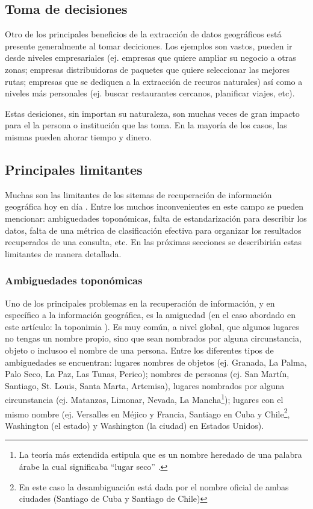 \subsection{Toma de decisiones}\label{sec:deci}

Otro de los principales beneficios de la extracción de datos geográficos está
presente generalmente al tomar deciciones. Los ejemplos son vastos, pueden ir
desde niveles empresariales (ej. empresas que quiere ampliar su negocio a otras
zonas; empresas distribuidoras de paquetes que quiere seleccionar las mejores
rutas; empresas que se dediquen a la extracción de recuros naturales) así como
a niveles más personales (ej. buscar restaurantes cercanos, planificar viajes, etc).

Estas desiciones, sin importan su naturaleza, son muchas veces de gran impacto
para el la persona o institución que las toma. En la mayoría de los casos,
las mismas pueden ahorar tiempo y dinero.

\subsection{Principales limitantes}\label{sec:limit}

Muchas son las limitantes de los sitemas de recuperación de información
geográfica hoy en día \cite{purves2011,purves2004}. Entre los muchos
inconvenientes en este campo se pueden mencionar: ambiguedades toponómicas,
falta de estandarización para describir los datos, falta de una métrica de
clasificación efectiva para organizar los resultados recuperados de una
consulta, etc. En las próximas secciones se describirián estas limitantes de
manera detallada.

\subsubsection{Ambiguedades toponómicas}\label{sec:ambig}

Uno de los principales problemas en la recuperación de información, y en
específico a la información geográfica, es la amiguedad (en el caso abordado en
este artículo: la toponimia \cite{buscaldi2009}). Es muy común, a nivel global,
que algunos lugares no tengas un nombre propio, sino que sean nombrados por
alguna circunstancia, objeto o inclusoo el nombre de una persona. Entre los
diferentes tipos de ambiguedades se encuentran: lugares nombres de objetos (ej.
Granada, La Palma, Palo Seco, La Paz, Las Tunas, Perico); nombres de personas
(ej. San Martín, Santiago, St. Louis, Santa Marta, Artemisa), lugares nombrados
por alguna circunstancia (ej. Matanzas, Limonar, Nevada, La Mancha\footnote{La
teoría más extendida estipula que es un nombre heredado de una palabra árabe la
cual significaba ``lugar seco'' \cite{laMancha}.}); lugares con el mismo nombre
(ej. Versalles en Méjico y Francia, Santiago en Cuba y Chile\footnote{En este
caso la desambiguación está dada por el nombre oficial de ambas ciudades
(Santiago de Cuba y Santiago de Chile)}, Washington (el estado) y Washington (la
ciudad) en Estados Unidos).

